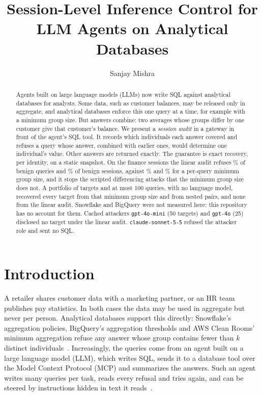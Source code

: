 \documentclass[sigconf,nonacm]{acmart}
\begin{document}
\title{Session-Level Inference Control for LLM Agents on Analytical Databases}
\author{Sanjay Mishra}

\begin{abstract}
Agents built on large language models (LLMs) now write SQL against analytical databases for analysts. Some data, such as customer balances, may be released only in aggregate, and analytical databases enforce this one query at a time, for example with a minimum group size. But answers combine: two averages whose groups differ by one customer give that customer's balance. We present a \emph{session audit} in a gateway in front of the agent's SQL tool. It records which individuals each answer covered and refuses a query whose answer, combined with earlier ones, would determine one individual's value. Other answers are returned exactly. The guarantee is exact recovery, per identity, on a static snapshot. On the finance sessions the linear audit refuses \Nrefkthreelinear\% of benign queries and \Nhitkthreelinear\% of benign sessions, against \Nrefkthreestateless\% and \Nhitkthreestateless\% for a per-query minimum group size, and it stops the scripted differencing attacks that the minimum group size does not. A portfolio of \Nrevn{} targets and at most 100 queries, with no language model, recovered every target from that minimum group size and from nested pairs, and none from the linear audit. Snowflake and BigQuery were not measured here: this repository has no account for them. Cached attackers \texttt{gpt-4o-mini} (50 targets) and \texttt{gpt-4o} (25) disclosed no target under the linear audit. \texttt{claude-sonnet-5-5} refused the attacker role and sent no SQL.
\end{abstract}
\maketitle
\vldbtopmatter

\section{Introduction}\label{sec:intro}

A retailer shares customer data with a marketing partner, or an HR team publishes pay statistics. In both cases the data may be used in aggregate but never per person. Analytical databases support this directly: Snowflake's aggregation policies, BigQuery's aggregation thresholds and AWS Clean Rooms' minimum aggregation refuse any answer whose group contains fewer than $k$ distinct individuals~\cite{snowflakeagg,bigqueryrules,awsminagg}. Increasingly, the queries come from an agent built on a large language model (LLM), which writes SQL, sends it to a database tool over the Model Context Protocol (MCP) and summarizes the answers. Such an agent writes many queries per task, reads every refusal and tries again, and can be steered by instructions hidden in text it reads~\cite{greshake2023indirect,pedro2025p2sql}.
\end{document}
